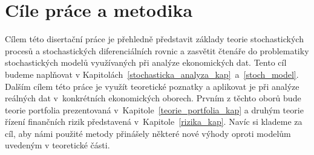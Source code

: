 \documentclass[a4paper,12pt]{report}
\theoremstyle{definition} \newtheorem{definice}[veta]{Definice}
\theoremstyle{remark}
\begin{document}

\chapter*{Cíle práce a metodika} 
Cílem této disertační práce je přehledně představit základy teorie stochastických procesů a stochastických diferenciálních rovnic a 
zasvětit čtenáře do problematiky stochastických modelů využívaných při analýze ekonomických dat.
Tento cíl budeme naplňovat v Kapitolách~\ref{stochasticka_analyza_kap}~a~\ref{stoch_model}.
Dalším cílem této práce je využít teoretické poznatky a aplikovat je při analýze reálných dat v~konkrétních ekonomických oborech.
Prvním z těchto oborů bude teorie portfolia prezentovaná v~Kapitole~\ref{teorie_portfolia_kap} a druhým teorie řízení finančních rizik představená v~Kapitole~\ref{rizika_kap}.
Navíc si klademe za cíl, aby námi použité metody přinášely některé nové výhody oproti modelům uvedeným v teoretické části.
\end{document}

